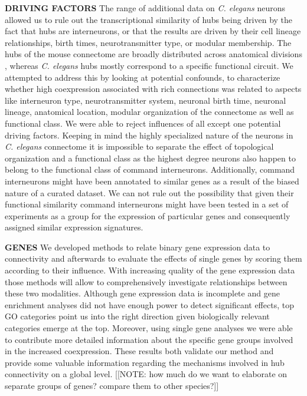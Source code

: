 \documentclass[10pt,letterpaper]{article}
\begin{document}
{\textbf{DRIVING FACTORS}
The range of additional data on \emph{C. elegans} neurons allowed us to rule out the transcriptional similarity of hubs being driven by the fact that hubs are interneurons, or that the results are driven by their cell lineage relationships, birth times, neurotransmitter type, or modular membership.
The hubs of the mouse connectome are broadly distributed across anatomical divisions \cite{Fulcher:2016ck}, whereas \emph{C. elegans} hubs mostly correspond to a specific functional circuit. 
We attempted to address this by looking at potential confounds, to characterize whether high coexpression associated with rich connections was related to aspects like interneuron type, neurotransmitter system, neuronal birth time, neuronal lineage, anatomical location, modular organization of the connectome as well as functional class.
We were able to reject influences of all except one potential driving factors. 
Keeping in mind the highly specialized nature of the neurons in \textit{C. elegans} connectome it is impossible to separate the effect of topological organization and a functional class as the highest degree neurons also happen to belong to the functional class of command interneurons. 
Additionally, command interneurons might have been annotated to similar genes as a result of the  biased nature of a curated dataset. 
We can not rule out the possibility that given their functional similarity command interneurons might have been tested in a set of experiments as a group for the expression of particular genes and consequently assigned similar expression signatures. 


\textbf{GENES}
We developed methods to relate binary gene expression data to connectivity and afterwards to evaluate the effects of single genes by scoring them according to their influence.
With increasing quality of the gene expression data those methods will allow to comprehensively investigate relationships between these two modalities. 
Although gene expression data is incomplete and gene enrichment analyses did not have enough power to detect significant effects, top GO categories point us into the right direction given biologically relevant categories emerge at the top.
Moreover, using single gene analyses we were able to contribute more detailed information about the specific gene groups involved in the increased coexpression. 
These results both validate our method and provide some valuable information regarding the mechanisms involved in hub connectivity on a global level.
[[NOTE: how much do we want to elaborate on separate groups of genes? compare them to other species?]]



}
\end{document}
